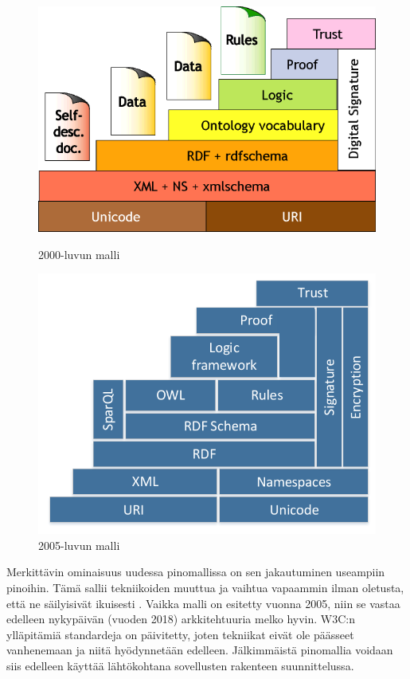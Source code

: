 \documentclass[finnish, 12pt, a4paper, elec, utf8, pdfa, online]{aaltothesis}
\begin{document}
{%
\begin{figure}[htb]
\begin{minipage}[b]{0.48\linewidth}
\includegraphics[width=\linewidth]{images/sweb-stack.png}
\caption{2000-luvun malli \cite{stack_bl} \label{images/sweb-stack.png}}
\end{minipage}
\hfill
\begin{minipage}[b]{0.48\linewidth}
\includegraphics[width=\linewidth]{images/Semantic_web_stack_one_col.pdf}
\caption{2005-luvun malli \cite{stack} \label{images/Semantic_web_stack_one_col.pdf}}
\end{minipage}%
\end{figure}
\enlargethispage{-\baselineskip}
Merkittävin ominaisuus uudessa pinomallissa on sen jakautuminen useampiin pinoihin. Tämä sallii tekniikoiden muuttua ja vaihtua vapaammin ilman oletusta, että ne säilyisivät ikuisesti \cite{stack}. Vaikka malli on esitetty vuonna 2005, niin se vastaa edelleen nykypäivän (vuoden 2018) arkkitehtuuria melko hyvin. W3C:n ylläpitämiä standardeja on päivitetty, joten tekniikat eivät ole päässeet vanhenemaan ja niitä hyödynnetään edelleen. Jälkimmäistä pinomallia voidaan siis edelleen käyttää lähtökohtana sovellusten rakenteen suunnittelussa.

}
\end{document}
